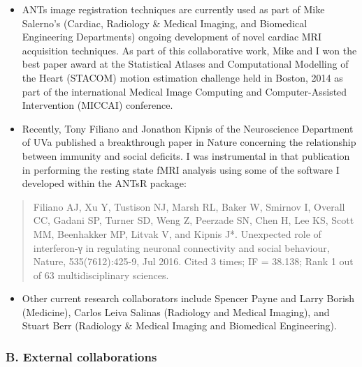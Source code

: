 \documentclass[11pt,]{article}
\providecommand{\tightlist}{%
  \setlength{\itemsep}{0pt}\setlength{\parskip}{0pt}}
\begin{document}
\begin{itemize}
  \begin{itemize}
  \item
    ANTs image registration techniques are currently used as part of
    Mike Salerno's (Cardiac, Radiology \& Medical Imaging, and
    Biomedical Engineering Departments) ongoing development of novel
    cardiac MRI acquisition techniques. As part of this collaborative
    work, Mike and I won the best paper award at the Statistical Atlases
    and Computational Modelling of the Heart (STACOM) motion estimation
    challenge held in Boston, 2014 as part of the international Medical
    Image Computing and Computer-Assisted Intervention (MICCAI)
    conference.
  \item
    Recently, Tony Filiano and Jonathon Kipnis of the Neuroscience
    Department of UVa published a breakthrough paper in Nature
    concerning the relationship between immunity and social deficits. I
    was instrumental in that publication in performing the resting state
    fMRI analysis using some of the software I developed within the
    ANTsR package:
  \end{itemize}

  \begin{quote}
  Filiano AJ, Xu Y, Tustison NJ, Marsh RL, Baker W, Smirnov I, Overall
  CC, Gadani SP, Turner SD, Weng Z, Peerzade SN, Chen H, Lee KS, Scott
  MM, Beenhakker MP, Litvak V, and Kipnis J*. Unexpected role of
  interferon-γ in regulating neuronal connectivity and social behaviour,
  Nature, 535(7612):425-9, Jul 2016. Cited 3 times; IF = 38.138; Rank 1
  out of 63 multidisciplinary sciences.
  \end{quote}

  \begin{itemize}
  \tightlist
  \item
    Other current research collaborators include Spencer Payne and Larry
    Borish (Medicine), Carlos Leiva Salinas (Radiology and Medical
    Imaging), and Stuart Berr (Radiology \& Medical Imaging and
    Biomedical Engineering).
  \end{itemize}
\end{itemize}

\subsubsection{B. External
collaborations}\label{b.-external-collaborations}
\end{document}
